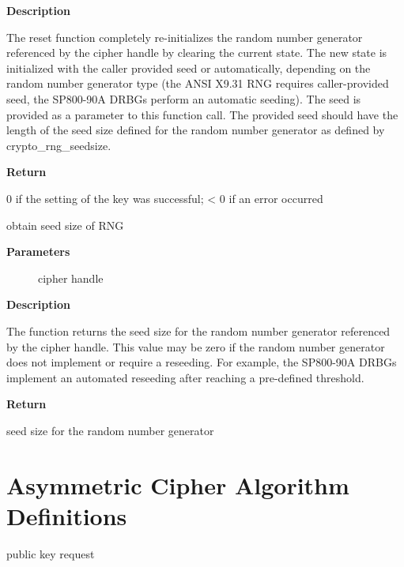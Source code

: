 \documentclass[a4paper,8pt,english]{sphinxmanual}
\begin{document}
\textbf{Description}

The reset function completely re-initializes the random number generator
referenced by the cipher handle by clearing the current state. The new state
is initialized with the caller provided seed or automatically, depending
on the random number generator type (the ANSI X9.31 RNG requires
caller-provided seed, the SP800-90A DRBGs perform an automatic seeding).
The seed is provided as a parameter to this function call. The provided seed
should have the length of the seed size defined for the random number
generator as defined by crypto\_rng\_seedsize.

\textbf{Return}

0 if the setting of the key was successful; \textless{} 0 if an error occurred

\begin{fulllineitems}
\label{crypto/api-rng:c.crypto_rng_seedsize}
obtain seed size of RNG

\end{fulllineitems}


\textbf{Parameters}
\begin{description}
\item[{}] \leavevmode
cipher handle

\end{description}

\textbf{Description}

The function returns the seed size for the random number generator
referenced by the cipher handle. This value may be zero if the random
number generator does not implement or require a reseeding. For example,
the SP800-90A DRBGs implement an automated reseeding after reaching a
pre-defined threshold.

\textbf{Return}

seed size for the random number generator


\section{Asymmetric Cipher Algorithm Definitions}
\label{crypto/api-akcipher:asymmetric-cipher-algorithm-definitions}\label{crypto/api-akcipher::doc}

\begin{fulllineitems}
\label{crypto/api-akcipher:c.akcipher_request}
public key request

\end{fulllineitems}
\end{document}
